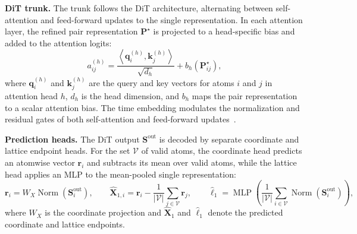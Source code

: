 \textbf{DiT trunk.}
The trunk follows the DiT architecture, alternating between self-attention and
feed-forward updates to the single representation. In each attention layer, the
refined pair representation $\mathbf{P}^{\star}$ is projected to a
head-specific bias and added to the attention logits:
\begin{equation*}
a_{ij}^{(h)}
=
\frac{\left\langle\mathbf{q}_i^{(h)},\mathbf{k}_j^{(h)}\right\rangle}
{\sqrt{d_h}}
+b_h\!\left(\mathbf{P}_{ij}^{\star}\right),
\end{equation*}
where $\mathbf{q}_i^{(h)}$ and $\mathbf{k}_j^{(h)}$ are the query and key
vectors for atoms $i$ and $j$ in attention head $h$, $d_h$ is the head
dimension, and $b_h$ maps the pair representation to a scalar attention bias.
The time embedding modulates the normalization and residual gates of both
self-attention and feed-forward updates~\citep{peebles2023scalable}.

\textbf{Prediction heads.}
The DiT output $\mathbf{S}^{\mathrm{out}}$ is decoded by separate coordinate and
lattice endpoint heads. For the set $\mathcal V$ of valid atoms, the coordinate
head predicts an atomwise vector $\mathbf r_i$ and subtracts its mean over valid
atoms, while the lattice head applies an MLP to the mean-pooled single
representation:
\begin{equation*}
\mathbf{r}_i
= W_X \operatorname{Norm}(\mathbf{S}^{\mathrm{out}}_i),\qquad
\widehat{\mathbf{X}}_{1,i}
= \mathbf{r}_i
- \frac{1}{|\mathcal V|}\sum_{j\in\mathcal V}\mathbf{r}_j,\qquad
\widehat{\boldsymbol{\ell}}_1
= \operatorname{MLP}\!\left(
\frac{1}{|\mathcal V|}\sum_{i\in\mathcal V}
\operatorname{Norm}(\mathbf{S}^{\mathrm{out}}_i)
\right),
\end{equation*}
where $W_X$ is the coordinate projection and
$\widehat{\mathbf{X}}_1$ and $\widehat{\boldsymbol{\ell}}_1$ denote the predicted
coordinate and lattice endpoints.